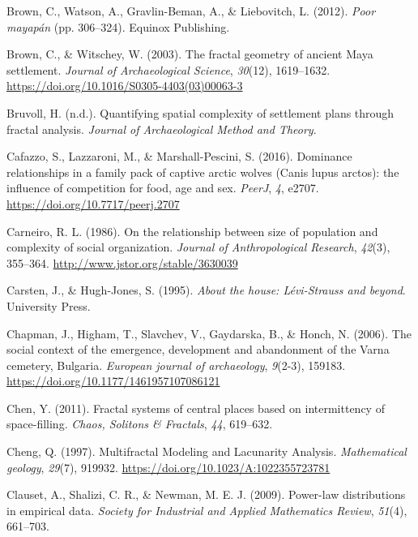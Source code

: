 \documentclass[
  12pt,
]{book}
\newlength{\cslhangindent}
\newlength{\cslentryspacingunit} %
\newenvironment{CSLReferences}[2] %
 {%
  \setlength{\parindent}{0pt}
  \ifodd #1
  \let\oldpar\par
  \def\par{\hangindent=\cslhangindent\oldpar}
  \fi
  \setlength{\parskip}{#2\cslentryspacingunit}
 }%
 {}
\begin{document}
\begin{CSLReferences}{1}{0}
\leavevmode{}%
Brown, C., Watson, A., Gravlin-Beman, A., \& Liebovitch, L. (2012). \emph{Poor mayapán} (pp. 306--324). Equinox Publishing.

\leavevmode{}%
Brown, C., \& Witschey, W. (2003). The fractal geometry of ancient Maya settlement. \emph{Journal of Archaeological Science}, \emph{30}(12), 1619--1632. \url{https://doi.org/10.1016/S0305-4403(03)00063-3}

\leavevmode{}%
Bruvoll, H. (n.d.). Quantifying spatial complexity of settlement plans through fractal analysis. \emph{Journal of Archaeological Method and Theory}.

\leavevmode{}%
Cafazzo, S., Lazzaroni, M., \& Marshall-Pescini, S. (2016). Dominance relationships in a family pack of captive arctic wolves (Canis lupus arctos): the influence of competition for food, age and sex. \emph{PeerJ}, \emph{4}, e2707. \url{https://doi.org/10.7717/peerj.2707}

\leavevmode{}%
Carneiro, R. L. (1986). On the relationship between size of population and complexity of social organization. \emph{Journal of Anthropological Research}, \emph{42}(3), 355--364. \url{http://www.jstor.org/stable/3630039}

\leavevmode{}%
Carsten, J., \& Hugh-Jones, S. (1995). \emph{About the house: Lévi-Strauss and beyond}. University Press.

\leavevmode{}%
Chapman, J., Higham, T., Slavchev, V., Gaydarska, B., \& Honch, N. (2006). The social context of the emergence, development and abandonment of the Varna cemetery, Bulgaria. \emph{European journal of archaeology}, \emph{9}(2-3), 159183. \url{https://doi.org/10.1177/1461957107086121}

\leavevmode{}%
Chen, Y. (2011). Fractal systems of central places based on intermittency of space-filling. \emph{Chaos, Solitons \& Fractals}, \emph{44}, 619--632.

\leavevmode{}%
Cheng, Q. (1997). Multifractal Modeling and Lacunarity Analysis. \emph{Mathematical geology}, \emph{29}(7), 919932. \url{https://doi.org/10.1023/A:1022355723781}

\leavevmode{}%
Clauset, A., Shalizi, C. R., \& Newman, M. E. J. (2009). Power-law distributions in empirical data. \emph{Society for Industrial and Applied Mathematics Review}, \emph{51}(4), 661--703.


\end{CSLReferences}
\end{document}
